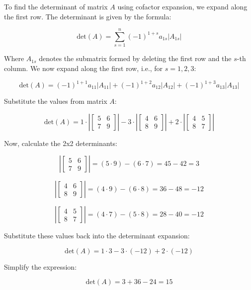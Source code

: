 \documentclass{article}
\begin{document}
To find the determinant of matrix \( A \) using cofactor expansion, we expand along the first row. The determinant is given by the formula:

\[
\text{det}(A) = \sum_{s=1}^{n} (-1)^{1+s} a_{1s} \left| A_{1s} \right|
\]

Where \( A_{1s} \) denotes the submatrix formed by deleting the first row and the \( s \)-th column. We now expand along the first row, i.e., for \( s = 1, 2, 3 \):

\[
\text{det}(A) = (-1)^{1+1} a_{11} \left| A_{11} \right| + (-1)^{1+2} a_{12} \left| A_{12} \right| + (-1)^{1+3} a_{13} \left| A_{13} \right|
\]

Substitute the values from matrix \( A \):

\[
\text{det}(A) = 1 \cdot \left| \begin{bmatrix} 5 & 6 \\ 7 & 9 \end{bmatrix} \right| - 3 \cdot \left| \begin{bmatrix} 4 & 6 \\ 8 & 9 \end{bmatrix} \right| + 2 \cdot \left| \begin{bmatrix} 4 & 5 \\ 8 & 7 \end{bmatrix} \right|
\]

Now, calculate the 2x2 determinants:

\[
\left| \begin{bmatrix} 5 & 6 \\ 7 & 9 \end{bmatrix} \right| = (5 \cdot 9) - (6 \cdot 7) = 45 - 42 = 3
\]

\[
\left| \begin{bmatrix} 4 & 6 \\ 8 & 9 \end{bmatrix} \right| = (4 \cdot 9) - (6 \cdot 8) = 36 - 48 = -12
\]

\[
\left| \begin{bmatrix} 4 & 5 \\ 8 & 7 \end{bmatrix} \right| = (4 \cdot 7) - (5 \cdot 8) = 28 - 40 = -12
\]

Substitute these values back into the determinant expansion:

\[
\text{det}(A) = 1 \cdot 3 - 3 \cdot (-12) + 2 \cdot (-12)
\]

Simplify the expression:

\[
\text{det}(A) = 3 + 36 - 24 = 15
\]
\end{document}
